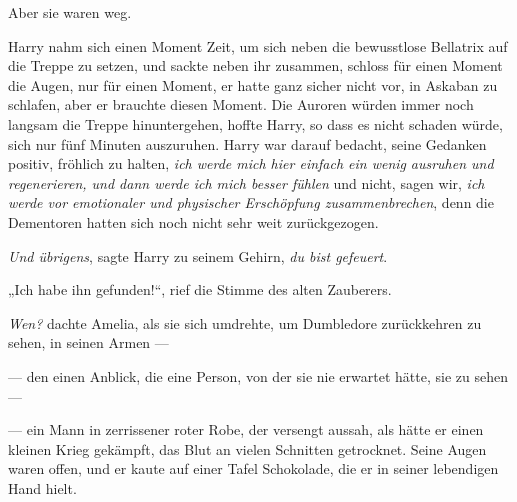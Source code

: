 Aber sie waren weg.

Harry nahm sich einen Moment Zeit, um sich neben die bewusstlose Bellatrix auf die Treppe zu setzen, und sackte neben ihr zusammen, schloss für einen Moment die Augen, nur für einen Moment, er hatte ganz sicher nicht vor, in Askaban zu schlafen, aber er brauchte diesen Moment. Die Auroren würden immer noch langsam die Treppe hinuntergehen, hoffte Harry, so dass es nicht schaden würde, sich nur fünf Minuten auszuruhen. Harry war darauf bedacht, seine Gedanken positiv, fröhlich zu halten, \emph{ich werde mich hier einfach ein wenig} \emph{ausruhen und} \emph{regenerieren, und dann werde ich mich besser fühlen} und nicht, sagen wir, \emph{ich werde vor emotionaler und physischer Erschöpfung zusammenbrechen}, denn die Dementoren hatten sich noch nicht sehr weit zurückgezogen.

\emph{Und übrigens}, sagte Harry zu seinem Gehirn, \emph{du bist gefeuert}.

\later

„Ich habe ihn gefunden!“, rief die Stimme des alten Zauberers.

\emph{Wen?} dachte Amelia, als sie sich umdrehte, um Dumbledore zurückkehren zu sehen, in seinen Armen —

— den einen Anblick, die eine Person, von der sie nie erwartet hätte, sie zu sehen —

— ein Mann in zerrissener roter Robe, der versengt aussah, als hätte er einen kleinen Krieg gekämpft, das Blut an vielen Schnitten getrocknet. Seine Augen waren offen, und er kaute auf einer Tafel Schokolade, die er in seiner lebendigen Hand hielt.

